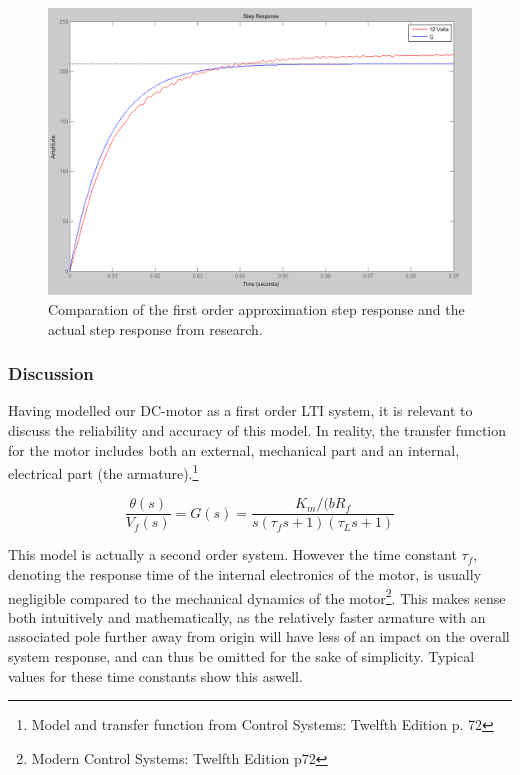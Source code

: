 \begin{figure}[h!]
\centering
\includegraphics[scale=0.35]{Billeder/FirstOrderApproximation.png}
\caption{Comparation of the first order approximation step response and the actual step response from research.}
\label{fig:FirstOrderApproximation}
\end{figure}

\subsubsection{Discussion}
Having modelled our DC-motor as a first order LTI system, it is relevant to discuss the reliability and accuracy of this model. In reality, the transfer function for the motor includes both an external, mechanical part and an internal, electrical part (the armature).\footnote{Model and transfer function from Control Systems: Twelfth Edition p. 72}

\begin{equation}
\frac{\theta(s)}{V_f (s)}=G(s)=\frac{K_m / (bR_f}{s(\tau_f s+1)(\tau_L s+1)}
\end{equation}

This model is actually a second order system. However the time constant $\tau_f$, denoting the response time of the internal electronics of the motor, is usually negligible compared to the mechanical dynamics of the motor\footnote{Modern Control Systems: Twelfth Edition p72}. This makes sense both intuitively and mathematically, as the relatively faster armature with an associated pole further away from origin will have less of an impact on the overall system response, and can thus be omitted for the sake of simplicity. Typical values for these time constants show this aswell.

